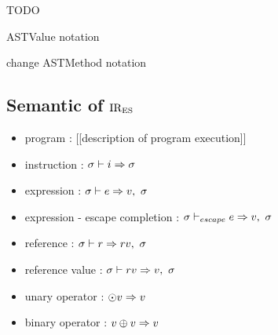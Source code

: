 TODO

ASTValue notation

change ASTMethod notation






\newpage

\subsection{Semantic of \( \text{IR}_\text{ES} \)}

\begin{itemize}
  \item program : [[description of program execution]]
  \item instruction : $\sigma \vdash i \Rightarrow \sigma$
  \item expression : $\sigma \vdash e \Rightarrow v,\ \sigma$
  \item expression - escape completion :
  $\sigma \vdash_{escape} e \Rightarrow v,\ \sigma$
  \item reference : $\sigma \vdash r \Rightarrow rv,\ \sigma$
  \item reference value : $\sigma \vdash rv \Rightarrow v,\ \sigma$
  \item unary operator : $\odot v \Rightarrow v$
  \item binary operator : $v \oplus v \Rightarrow v$
\end{itemize}




